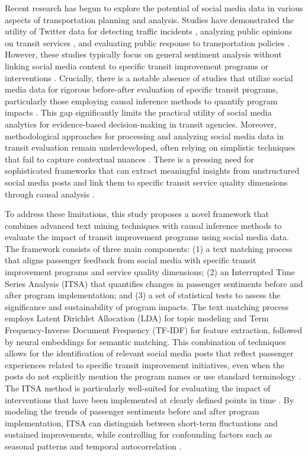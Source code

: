 \documentclass[a4paper,fleqn,12pt]{cas-sc}
\begin{document}
Recent research has begun to explore the potential of social media data in various aspects of transportation planning and analysis. Studies have demonstrated the utility of Twitter data for detecting traffic incidents \citep{fu2015social}, analyzing public opinions on transit services \citep{luong2015public, collins2013novel}, and evaluating public response to transportation policies \citep{chakraborty2019public}. However, these studies typically focus on general sentiment analysis without linking social media content to specific transit improvement programs or interventions \citep{ali2017fuzzy, ingvardson2019relationship}. Crucially, there is a notable absence of studies that utilize social media data for rigorous before-after evaluation of specific transit programs, particularly those employing causal inference methods to quantify program impacts \citep{mathur2021exploratory, liu2017monitoring}. This gap significantly limits the practical utility of social media analytics for evidence-based decision-making in transit agencies. Moreover, methodological approaches for processing and analyzing social media data in transit evaluation remain underdeveloped, often relying on simplistic techniques that fail to capture contextual nuances \citep{houston2015public, kamga2023utilizing}. There is a pressing need for sophisticated frameworks that can extract meaningful insights from unstructured social media posts and link them to specific transit service quality dimensions through causal analysis \citep{haghighi2018using}.

To address these limitations, this study proposes a novel framework that combines advanced text mining techniques with causal inference methods to evaluate the impact of transit improvement programs using social media data. The framework consists of three main components: (1) a text matching process that aligns passenger feedback from social media with specific transit improvement programs and service quality dimensions; (2) an Interrupted Time Series Analysis (ITSA) that quantifies changes in passenger sentiments before and after program implementation; and (3) a set of statistical tests to assess the significance and sustainability of program impacts. The text matching process employs Latent Dirichlet Allocation (LDA) for topic modeling and Term Frequency-Inverse Document Frequency (TF-IDF) for feature extraction, followed by neural embeddings for semantic matching. This combination of techniques allows for the identification of relevant social media posts that reflect passenger experiences related to specific transit improvement initiatives, even when the posts do not explicitly mention the program names or use standard terminology \citep{blei2003latent, lopez2016interrupted}. The ITSA method is particularly well-suited for evaluating the impact of interventions that have been implemented at clearly defined points in time \citep{wagner2002segmented, lopez2016interrupted}. By modeling the trends of passenger sentiments before and after program implementation, ITSA can distinguish between short-term fluctuations and sustained improvements, while controlling for confounding factors such as seasonal patterns and temporal autocorrelation \citep{schaffer2021interrupted, koppel2023disentangling}.
\end{document}
